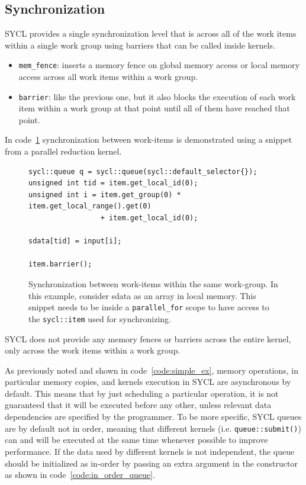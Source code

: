 \subsection{Synchronization}
\label{ch:synchronization}
SYCL provides a single synchronization level that is across all of the work items within a single work group using barriers that can be called inside kernels.
\begin{itemize}
    \item \Verb "mem_fence": inserts a memory fence on global memory access or local memory access across all work items within a work group.
    \item \Verb "barrier": like the previous one, but it also blocks the execution of each work item within a work group at that point until all of them have reached that point.
\end{itemize}
In code~\ref{code:item_barriers} synchronization between work-items is demonstrated using a snippet from a parallel reduction kernel.

\begin{figure}[ht!]
\renewcommand{\figurename}{Code}
\begin{verbatim}
sycl::queue q = sycl::queue(sycl::default_selector{});
unsigned int tid = item.get_local_id(0);
unsigned int i = item.get_group(0) * item.get_local_range().get(0) 
                 + item.get_local_id(0);

sdata[tid] = input[i];

item.barrier();
\end{verbatim}
\caption{Synchronization between work-items within the same work-group. In this example, consider sdata as an array in local memory. This snippet needs to be inside a \protect\Verb "parallel_for" scope to have access to the \protect\Verb "sycl::item" used for synchronizing.}
\label{code:item_barriers}
\end{figure}

SYCL does not provide any memory fences or barriers across the entire kernel, only across the work items within a work group.

As previously noted and shown in code~\ref{code:simple_ex}, memory operations, in particular memory copies, and kernels execution in SYCL are asynchronous by default. This means that by just scheduling a particular operation, it is not guaranteed that it will be executed before any other, unless relevant data dependencies are specified by the programmer. To be more specific, SYCL queues are by default not in order, meaning that different kernels (i.e. \Verb "queue::submit()") can and will be executed at the same time whenever possible to improve performance.
If the data used by different kernels is not independent, the queue should be initialized as in-order by passing an extra argument in the constructor as shown in code~\ref{code:in_order_queue}.

